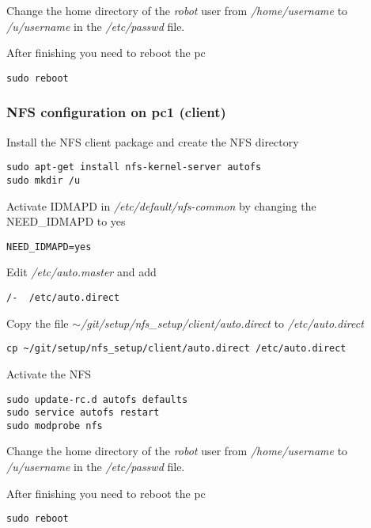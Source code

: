 Change the home directory of the \textit{robot} user from \textit{/home/username} to \textit{/u/username} in the \textit{/etc/passwd} file.

After finishing you need to reboot the pc

\begin{lstlisting}
sudo reboot
\end{lstlisting}

\subsubsection{NFS configuration on pc1 (client)}
Install the NFS client package and create the NFS directory

\begin{lstlisting}
sudo apt-get install nfs-kernel-server autofs
sudo mkdir /u
\end{lstlisting}

Activate IDMAPD in \textit{/etc/default/nfs-common} by changing the NEED\_IDMAPD to yes

\begin{lstlisting} 
NEED_IDMAPD=yes
\end{lstlisting}

Edit \textit{/etc/auto.master} and add

\begin{lstlisting}
/-	/etc/auto.direct
\end{lstlisting}

Copy the file \textit{$\sim$/git/setup/nfs\_setup/client/auto.direct} to \textit{/etc/auto.direct}

\begin{lstlisting}
cp ~/git/setup/nfs_setup/client/auto.direct /etc/auto.direct
\end{lstlisting}

Activate the NFS

\begin{lstlisting}
sudo update-rc.d autofs defaults
sudo service autofs restart
sudo modprobe nfs
\end{lstlisting}

Change the home directory of the \textit{robot} user from \textit{/home/username} to \textit{/u/username} in the \textit{/etc/passwd} file.

After finishing you need to reboot the pc

\begin{lstlisting} 
sudo reboot
\end{lstlisting}

